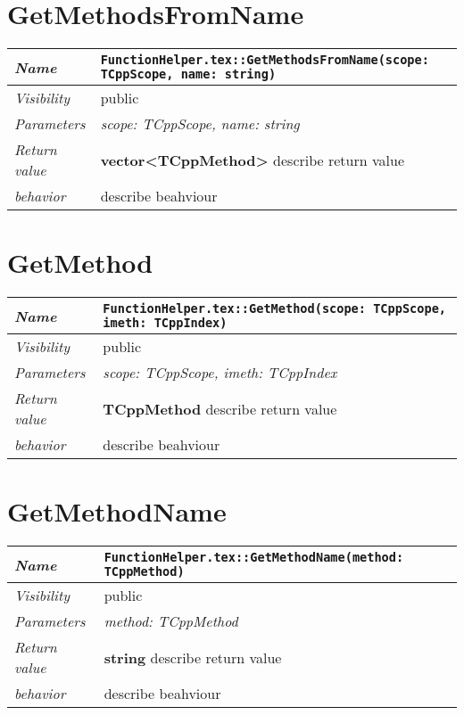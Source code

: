  \section{GetMethodsFromName}
\begin{longtable}{p{3cm} @{\hskip 1cm} p{12cm}}
 \hline
\textit{Name} & \texttt{FunctionHelper.tex::GetMethodsFromName(scope: TCppScope, name: string)}\\
\hline
 \textit{Visibility} & public\\
\hline
\textit{Parameters} & \textit{scope: TCppScope, name: string}\\
\hline
\textit{Return value} & \textbf{ vector<TCppMethod>} describe return value\\
  \hline
 \textit{behavior} & describe beahviour \\
\hline
\end{longtable} \pagebreak
 \section{GetMethod}
\begin{longtable}{p{3cm} @{\hskip 1cm} p{12cm}}
 \hline
\textit{Name} & \texttt{FunctionHelper.tex::GetMethod(scope: TCppScope, imeth: TCppIndex)}\\
\hline
 \textit{Visibility} & public\\
\hline
\textit{Parameters} & \textit{scope: TCppScope, imeth: TCppIndex}\\
\hline
\textit{Return value} & \textbf{ TCppMethod} describe return value\\
  \hline
 \textit{behavior} & describe beahviour \\
\hline
\end{longtable} \pagebreak
 \section{GetMethodName}
\begin{longtable}{p{3cm} @{\hskip 1cm} p{12cm}}
 \hline
\textit{Name} & \texttt{FunctionHelper.tex::GetMethodName(method: TCppMethod)}\\
\hline
 \textit{Visibility} & public\\
\hline
\textit{Parameters} & \textit{method: TCppMethod}\\
\hline
\textit{Return value} & \textbf{ string} describe return value\\
  \hline
 \textit{behavior} & describe beahviour \\
\hline
\end{longtable} \pagebreak
